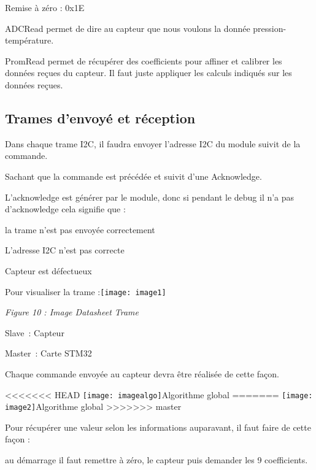 \noindent Remise \`{a} z\'{e}ro : 0x1E

\noindent ADCRead permet de dire au capteur que nous voulons la donn\'{e}e pression-temp\'{e}rature.

\noindent PromRead permet de r\'{e}cup\'{e}rer des coefficients pour affiner et calibrer les donn\'{e}es re\c{c}ues du capteur. Il faut juste appliquer les calculs indiqu\'{e}s sur les donn\'{e}es re\c{c}ues.\underbar{}

\noindent 
\subsection{Trames d'envoy\'{e} et r\'{e}ception}

\noindent 

\noindent Dans chaque trame I2C, il faudra envoyer l'adresse I2C du module suivit de la commande.

\noindent Sachant que la commande est pr\'{e}c\'{e}d\'{e}e et suivit d'une Acknowledge.

\noindent L'acknowledge est g\'{e}n\'{e}rer par le module, donc si pendant le debug il n'a pas d'acknowledge cela signifie que :

\noindent  la trame n'est pas envoy\'{e}e correctement

\noindent  L'adresse I2C n'est pas correcte

\noindent  Capteur est d\'{e}fectueux

\noindent Pour visualiser la trame :\texttt{[image: image1]}

\noindent \textit{Figure 10 : Image Datasheet Trame}

\noindent 

\noindent Slave~: Capteur

\noindent Master~: Carte STM32

\noindent Chaque commande envoy\'{e}e au capteur devra \^{e}tre r\'{e}alis\'{e}e de cette fa\c{c}on.

\noindent 

<<<<<<< HEAD
\noindent \texttt{[image: imagealgo]}Algorithme global
=======
\noindent \texttt{[image: image2]}Algorithme global
>>>>>>> master

\noindent Pour r\'{e}cup\'{e}rer une valeur selon les informations auparavant, il faut faire de cette fa\c{c}on :

\noindent au d\'{e}marrage il faut remettre \`{a} z\'{e}ro, le capteur puis demander les 9 coefficients.

